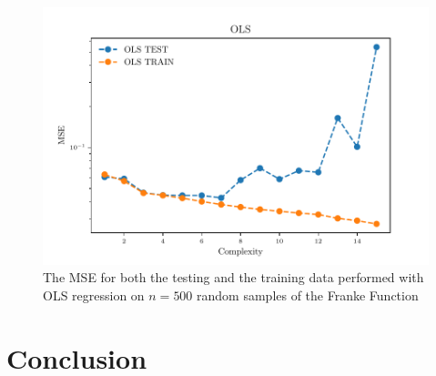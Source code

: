 \documentclass[reprint, english, nofootinbib]{revtex4-2}
\begin{document}
    \begin{figure}[h!tb]
        \center
        \includegraphics[width=\columnwidth]{../figs/OLS_MSE_Bootstrap_Hastie_211.pdf}
        \caption{\label{fig:Hastie2.11 MSE Bootstrap}The MSE for both the testing and the training data performed with OLS regression on $n=500$ random samples of the Franke Function}
    \end{figure}


\section{Conclusion}

\onecolumngrid

\newpage
\twocolumngrid
\appendix
\end{document}

